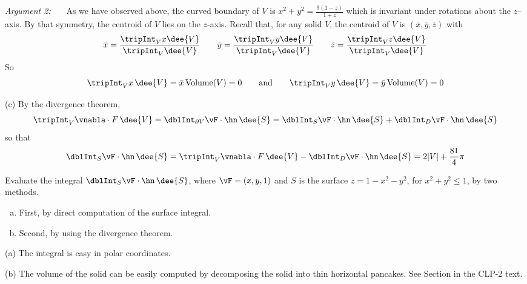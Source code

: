 \begin{solution}
\emph{Argument 2:} \ \ \ As we have observed above, the
curved boundary of $V$ is $x^2+y^2 = \frac{9(1-z)}{1+z}$ which
is invariant under rotations about the $z$--axis. By that symmetry, the 
centroid of $V$ lies on the $z$-axis. Recall that, for any solid $V$,
the centroid of $V$ is $(\bar x,\bar y,\bar z)$ with
\begin{equation*}
\bar x = \frac{\tripInt_V x \dee{V}}{\tripInt_V \dee{V}}\qquad
\bar y = \frac{\tripInt_V y \dee{V}}{\tripInt_V \dee{V}}\qquad
\bar z = \frac{\tripInt_V z \dee{V}}{\tripInt_V \dee{V}}
\end{equation*}
So
\begin{equation*}
\tripInt_V x\,\dee{V} = \bar x\, \text{Volume}(V) =0 \qquad\text{and}\qquad
\tripInt_V y\,\dee{V} = \bar y\,  \text{Volume}(V) =0 
\end{equation*}

(c)
By the divergence theorem,
\begin{equation*}
\tripInt_V\vnabla\cdot F\,\dee{V}
=\dblInt_{\partial V}\vF\cdot \hn\,\dee{S}
=\dblInt_S\vF\cdot \hn\,\dee{S}
+\dblInt_D\vF\cdot \hn\,\dee{S}
\end{equation*}
so that
\begin{equation*}
\dblInt_S\vF\cdot \hn\,\dee{S}
=\tripInt_V\vnabla\cdot F\,\dee{V}
-\dblInt_D\vF\cdot \hn\,\dee{S}
=2|V|+\frac{81}{4}\pi
\end{equation*}
\end{solution}

\goodbreak
\begin{question}
Evaluate the integral $\dblInt_S\vF\cdot \hn\,\dee{S}$,
where $\vF=(x,y,1)$ and $S$ is the surface $z=1-x^2-y^2$, 
for $x^2+y^2\le 1$, by two methods.
\begin{enumerate}[(a)]
\item
First, by direct computation of the surface integral.
\item
Second, by using the divergence theorem.
\end{enumerate}
\end{question}

\begin{hint} 
(a) The integral is easy in polar coordinates.

(b) The volume of the solid can be easily computed by decomposing the solid
into thin horizontal pancakes. See Section 
in the CLP-2 text.

\end{hint}

